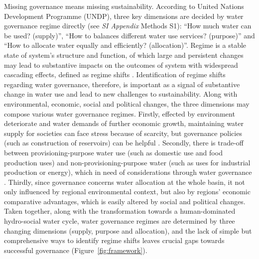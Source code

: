 \documentclass[9pt, twocolumn, twoside, lineno]{pnas-new}
\begin{document}
\label{introduction-section-2}
Missing governance means missing sustainability.
According to United Nations Development Programme (UNDP), three key dimensions are decided by water governance regime directly (see \textit{SI Appendix} Methods S1): ``How much water can be used? (supply)'', ``How to balances different water use services? (purpose)'' and ``How to allocate water equally and efficiently? (allocation)''.
Regime is a stable state of system’s structure and function, of which large and persistent changes may lead to substantive impacts on the outcomes of system with widespread cascading effects, defined as regime shifts 
\cite{rochaCascadingRegimeShifts2018,schefferCatastrophicRegimeShifts2003, schefferCatastrophicShiftsEcosystems2001}.
Identification of regime shifts regarding water governance, therefore, is important as a signal of substantive change in water use and lead to new challenges to sustainability.
Along with environmental, economic, social and political changes, the three dimensions may compose various water governance regimes. 
Firstly, effected by environment deteriorate and water demands of further economic growth, maintaining water supply for societies can face stress because of scarcity, but governance policies (such as construction of reservoirs) can be helpful
\cite{postelHumanAppropriationRenewable1996, greveGlobalAssessmentWater2018, qinFlexibilityIntensityGlobal2019}.
Secondly, there is trade-off between provisioning-purpose water use (such as domestic use and food production uses) and non-provisioning-purpose water (such as uses for industrial production or energy), which in need of considerations through water governance
\cite{liuWaterScarcityAssessments2017, florkeWaterCompetitionCities2018}.
Thirdly, since governance concerns water allocation at the whole basin, it not only influenced by regional environmental context, but also by regions' economic comparative advantages, which is easily altered by social and political changes.
Taken together, along with the transformation towards a human-dominated hydro-social water cycle, water governance regimes are determined by three changing dimensions (supply, purpose and allocation), and the lack of simple but comprehensive ways to identify regime shifts leaves crucial gaps towards successful governance (Figure~\ref{fig:framework}).
\end{document}
